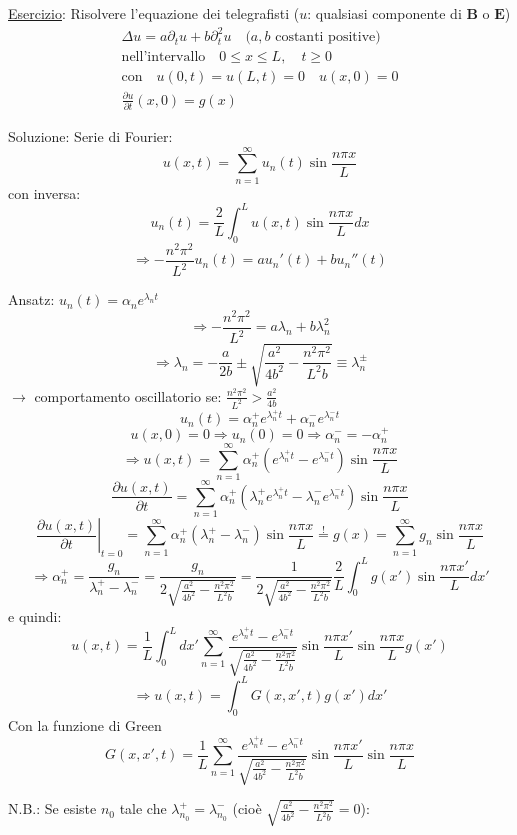 \documentclass[a4paper,11pt]{report}
\newcommand{\vect}[1]{\boldsymbol{#1}}
\begin{document}
\underline{Esercizio}: Risolvere l'equazione dei telegrafisti ($u$: qualsiasi componente di $\vect{B}$ o $\vect{E}$)
\[
\begin{gathered}
\Delta u = a\partial_t u + b \partial^2_t u \quad\text{($a,b$ costanti positive) } \\
\text{nell'intervallo}\quad 0\leq x\leq L, \quad t\geq 0 \\
\text{con}\quad u(0,t)=u(L,t)=0 \quad u(x,0)=0 \\
\frac{\partial u}{\partial t}(x,0) = g(x)
\end{gathered}
\]

Soluzione: Serie di Fourier:
\[
u(x,t)=\sum_{n=1}^\infty u_n(t) \sin \frac{n\pi x}{L}
\]
con inversa:
\[
u_n(t)=\frac{2}{L}\int_0^Lu(x,t)\sin \frac{n\pi x}{L}dx 
\]
\[
\Rightarrow -\frac{n^2\pi^2}{L^2}u_n(t)=au_n'(t) + b u_n''(t)
\]

Ansatz: $u_n(t)=\alpha_n e^{\lambda_n t}$
\[
\Rightarrow -\frac{n^2\pi^2}{L^2}=a\lambda_n + b \lambda_n^2
\]
\[
\Rightarrow \lambda_n = -\frac{a}{2b} \pm \sqrt{\frac{a^2}{4b^2}-\frac{n^2\pi^2}{L^2 b}}\equiv \lambda_n^\pm
\]
$\rightarrow$ comportamento oscillatorio se: $\frac{n^2\pi^2}{L^2}>\frac{a^2}{4b}$
\[
u_n(t)=\alpha_n^+ e^{\lambda_n^+ t} + \alpha_n^-e^{\lambda_n^- t}
\]
\[
u(x,0)=0 \Rightarrow u_n(0)=0 \Rightarrow \alpha_n^- = -\alpha_n^+
\]
\[
\Rightarrow u(x,t)=\sum_{n=1}^\infty \alpha_n^+ (e^{\lambda_n^+ t}-e^{\lambda_n^- t})\sin\frac{n\pi x}{L}
\]
\[
\frac{\partial u(x,t)}{\partial t} =\sum_{n=1}^\infty \alpha_n^+ \left(\lambda_n^+ e^{\lambda_n^+ t}-\lambda_n^-e^{\lambda_n^- t}  \right)\sin \frac{n\pi x}{L}
\]
\[
\left.\frac{\partial u(x,t)}{\partial t}\right|_{t=0}= \sum_{n=1}^\infty \alpha_n^+(\lambda_n^+ - \lambda_n^-)\sin\frac{n\pi x}{L} \overset{!}{=} g(x) = \sum_{n=1}^\infty g_n \sin \frac{n\pi x}{L}
\]
\[
\Rightarrow \alpha_n^+ = \frac{g_n}{\lambda_n^+ - \lambda_n^-}=\frac{g_n}{2\sqrt{\frac{a^2}{4b^2}-\frac{n^2\pi^2}{L^2 b}}}=\frac{1}{2\sqrt{\frac{a^2}{4b^2}-\frac{n^2\pi^2}{L^2 b}}} \frac{2}{L}\int_{0}
^{L}g(x')\sin\frac{n\pi x'}{L} dx'
\]
e quindi:
\[
u(x,t)=\frac{1}{L}\int_0^L dx' \sum_{n=1}^\infty \frac{e^{\lambda_n^+ t} - e^{\lambda_n^- t}}{\sqrt{\frac{a^2}{4b^2}-\frac{n^2\pi^2}{L^2 b}}}\sin\frac{n\pi x'}{L}\sin \frac{n\pi x}{L}g(x')
\]
\[
\Rightarrow u(x,t)=\int_0^L G(x,x',t)g(x')dx'
\]
Con la funzione di Green
\[
G(x,x',t)=\frac{1}{L} \sum_{n=1}^\infty \frac{e^{\lambda_n^+ t} - e^{\lambda_n^- t}}{\sqrt{\frac{a^2}{4b^2}-\frac{n^2\pi^2}{L^2 b}}}\sin\frac{n\pi x'}{L}\sin \frac{n\pi x}{L}
\]

N.B.: Se esiste $n_0$ tale che $\lambda_{n_0}^+ = \lambda_{n_0}^-$ (cio\`e $\sqrt{\frac{a^2}{4b^2}-\frac{n^2\pi^2}{L^2 b}}=0$):
\end{document}
